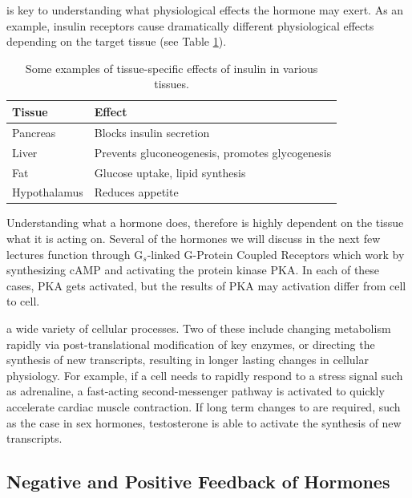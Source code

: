 \documentclass{tufte-handout}
\begin{document}
 is key to understanding what physiological effects the hormone may exert.  As an example, insulin receptors cause dramatically different physiological effects depending on the target tissue (see Table \ref{tab:insulin-tissue-roles}).

\begin{table}
  \centering
  \begin{tabular}{ll}
    \toprule
    Tissue & Effect \\
    \midrule
    Pancreas & Blocks insulin secretion \\
    Liver & Prevents gluconeogenesis, promotes glycogenesis\\
    Fat & Glucose uptake, lipid synthesis \\
    Hypothalamus & Reduces appetite \\
    \bottomrule
  \end{tabular}
  \caption{Some examples of tissue-specific effects of insulin in various tissues.}
  \label{tab:insulin-tissue-roles}
\end{table}

Understanding what a hormone does, therefore is highly dependent on the tissue what it is acting on.  Several of the hormones we will discuss in the next few lectures function through G$_{s}$-linked G-Protein Coupled Receptors which work by synthesizing cAMP and activating the protein kinase PKA.  In each of these cases, PKA gets activated, but the results of PKA may activation differ from cell to cell.

 a wide variety of cellular processes.  Two of these include changing metabolism rapidly via post-translational modification of key enzymes, or directing the synthesis of new transcripts, resulting in longer lasting changes in cellular physiology.  For example, if a cell needs to rapidly respond to a stress signal such as adrenaline, a fast-acting second-messenger pathway is activated to quickly accelerate cardiac muscle contraction.  If long term changes to  are required, such as the case in sex hormones, testosterone is able to activate the synthesis of new transcripts.


\subsection{Negative and Positive Feedback of Hormones}
\end{document}
